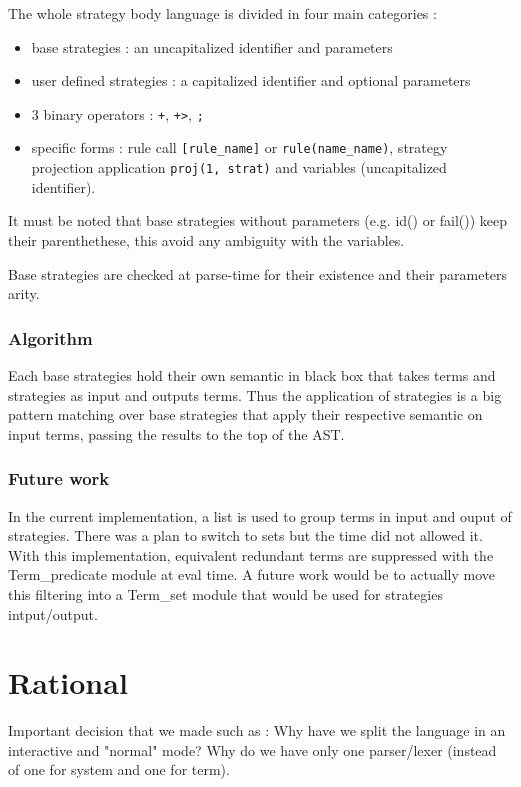 \documentclass[12pt,a4paper]{article}
\begin{document}
The whole strategy body language is divided in four main categories :
\begin{itemize}
\item base strategies : an uncapitalized identifier and parameters
\item user defined strategies : a capitalized identifier and optional parameters
\item 3 binary operators : \verb|+|, \verb|+>|, \verb|;|
\item specific forms : rule call \verb|[rule_name]| or \verb|rule(name_name)|,
strategy projection application \verb|proj(1, strat)| and variables (uncapitalized 
identifier).
\end{itemize}

It must be noted that base strategies without parameters (e.g. id() or fail()) keep
their parenthethese, this avoid any ambiguity with the variables. 

Base strategies are checked at parse-time for their existence and their parameters
arity.

\subsubsection*{Algorithm}
Each base strategies hold their own semantic in black box that takes terms and 
strategies as input and outputs terms. Thus the application of strategies is 
a big pattern matching over base strategies that apply their respective semantic
on input terms, passing the results to the top of the AST.

\subsubsection*{Future work}
In the current implementation, a list is used to group terms in input and ouput of 
strategies. There was a plan to switch to sets but the time did not allowed it. 
With this implementation, equivalent redundant terms are suppressed with the 
Term\_predicate module at eval time. A future work would be to actually move
this filtering into a Term\_set module that would be used for strategies 
intput/output.

\section{Rational}
\label{rational}
Important decision that we made such as : Why have we split the language in an interactive and "normal" mode? Why do we have only one parser/lexer (instead of one for system and one for term).
\end{document}
